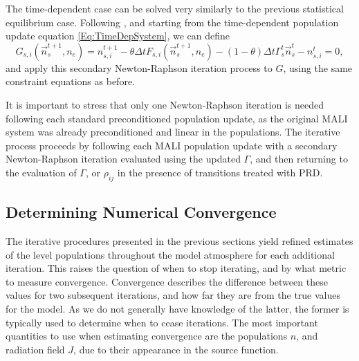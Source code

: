 The time-dependent case can be solved very similarly to the previous statistical equilibrium case.
Following \citet{Kasparova2003}, and starting from the time-dependent population update equation \eqref{Eq:TimeDepSystem}, we can define
\begin{equation}
    \label{Eq:TimeDepNrFn}
    G_{s,i}(\vec{n}^{t+1}_s, n_e) = n^{t+1}_{s,i} - \theta \Delta t F_{s,i}(\vec{n}^{t+1}_s, n_e) - (1-\theta)\Delta t \Gamma^t_s \vec{n}^t_s - n^t_{s,i} = 0,
\end{equation}
and apply this secondary Newton-Raphson iteration process to $G$, using the same constraint equations as before.

It is important to stress that only one Newton-Raphson iteration is needed following each standard preconditioned population update, as the original MALI system was already preconditioned and linear in the populations.
The iterative process proceeds by following each MALI population update with a secondary Newton-Raphson iteration evaluated using the updated $\Gamma$, and then returning to the evaluation of $\Gamma$, or $\rho_{ij}$ in the presence of transitions treated with PRD.

\subsection{Determining Numerical Convergence}

The iterative procedures presented in the previous sections yield refined estimates of the level populations throughout the model atmosphere for each additional iteration.
This raises the question of when to stop iterating, and by what metric to measure convergence.
Convergence describes the difference between these values for two subsequent iterations, and how far they are from the true values for the model.
As we do not generally have knowledge of the latter, the former is typically used to determine when to cease iterations.
The most important quantities to use when estimating convergence are the populations $n$, and radiation field $J$, due to their appearance in the source function.

